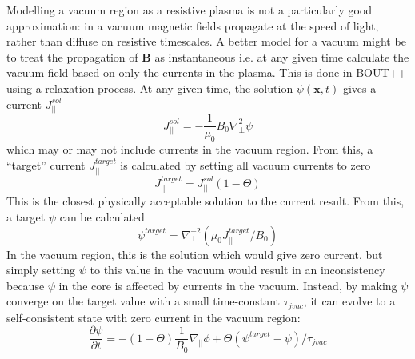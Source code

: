 \documentclass[12pt, a4paper]{article}
\newcommand{\deriv}[2]{\ensuremath{\frac{\partial #1}{\partial #2}}}
\newcommand{\Vec}[1]{\ensuremath{\mathbf{#1}}}
\newcommand{\Bvec}{\Vec{B}}
\newcommand{\Jpar}{J_{||}}
\newcommand{\delp}{\nabla_\perp^2}
\begin{document}
Modelling a vacuum region as a resistive plasma is not a particularly good approximation: in a vacuum
magnetic fields propagate at the speed of light, rather than diffuse on resistive timescales. 
A better model for a vacuum might be to treat the propagation of $\Bvec$ as instantaneous i.e.
at any given time calculate the vacuum field based on only the currents in the plasma.
This is done in BOUT++ using a relaxation process. At any given time, the solution
$\psi\left(\mathbf{x},t\right)$ gives a current $\Jpar^{sol}$
\[
\Jpar^{sol} = -\frac{1}{\mu_0}B_0\delp\psi
\]
which may or may not include currents in the vacuum region. From this, a ``target''
current $\Jpar^{target}$ is calculated by setting all vacuum currents to zero
\[
\Jpar^{target} = \Jpar^{sol} \left(1 - \Theta\right)
\]
This is the closest physically acceptable solution to the current result. From this, 
a target $\psi$ can be calculated
\[
\psi^{target} = \nabla_\perp^{-2}\left(\mu_0 \Jpar^{target} / B_0\right)
\]
In the vacuum region, this is the solution which would give zero current, but simply
setting $\psi$ to this value in the vacuum would result in an inconsistency because $\psi$ in the
core is affected by currents in the vacuum. Instead, by making
$\psi$ converge on the target value with a small time-constant $\tau_{jvac}$, it can evolve to a
self-consistent state with zero current in the vacuum region:
\[
\deriv{\psi}{t} = -\left(1-\Theta\right)\frac{1}{B_0}\nabla_{||}\phi +  \Theta\left(\psi^{target} - \psi\right) / \tau_{jvac}
\]
\end{document}
